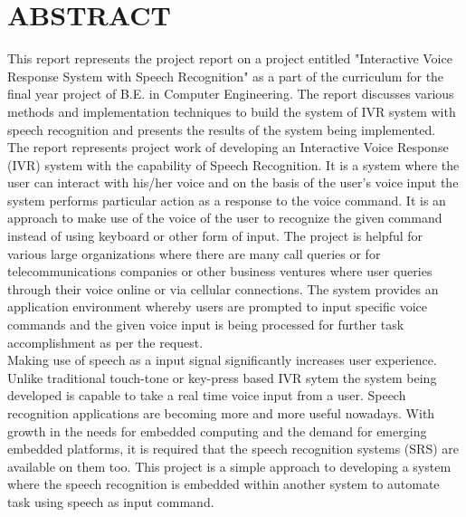 
\newpage
{} {}

\section*{ABSTRACT}

This report represents the project report on a project entitled "Interactive Voice Response System with Speech Recognition" as a part of the curriculum for the final year project of B.E. in Computer Engineering. The report discusses various methods and implementation techniques to build the system of IVR system with speech recognition and presents the results of the system being implemented. \\
The report represents project work of developing an Interactive Voice Response (IVR) system with the capability of Speech Recognition. It is a system where the user can interact with his/her voice and on the basis of the user's voice input the system performs particular action as a response to the voice command. It is an approach to make use of the voice of the user to recognize the given command instead of using keyboard or other form of input. The project is helpful for various large organizations where there are many call queries or for telecommunications companies or other business ventures where user queries through their voice online or via cellular connections. The system provides an application environment whereby users are prompted to input specific voice commands and the given voice input is being processed for further task accomplishment as per the request.\\
Making use of speech as a input signal significantly increases user experience. Unlike traditional touch-tone or key-press based IVR sytem the system being developed is capable to take a real time voice input from a user. Speech recognition applications are becoming more and more useful nowadays. With growth in the needs for embedded computing and the demand for emerging embedded platforms, it is required that the speech recognition systems (SRS) are available on them too. This project is a simple approach to developing a system where the speech recognition is embedded within another system to automate task using speech as input command. 
